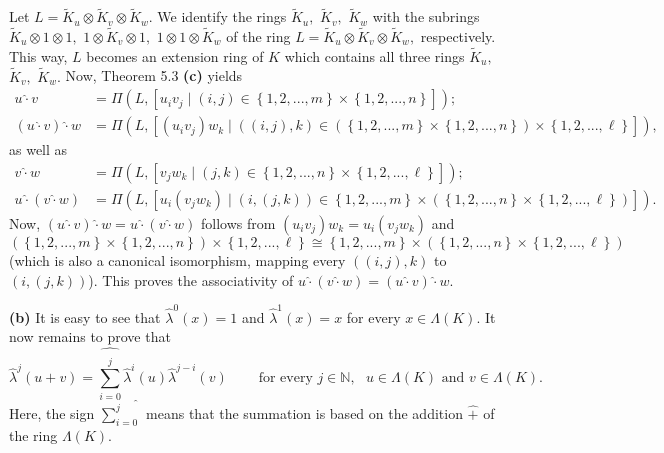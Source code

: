\documentclass[12pt,final,notitlepage,onecolumn,german]{article}%
\begin{document}
Let $L=\widetilde{K}_{u}\otimes\widetilde{K}_{v}\otimes\widetilde{K}_{w}$. We
identify the rings $\widetilde{K}_{u},$ $\widetilde{K}_{v},$ $\widetilde
{K}_{w}$ with the subrings $\widetilde{K}_{u}\otimes1\otimes1,$ $1\otimes
\widetilde{K}_{v}\otimes1,$ $1\otimes1\otimes\widetilde{K}_{w}$ of the ring
$L=\widetilde{K}_{u}\otimes\widetilde{K}_{v}\otimes\widetilde{K}_{w},$
respectively. This way, $L$ becomes an extension ring of $K$ which contains
all three rings $\widetilde{K}_{u},$ $\widetilde{K}_{v},$ $\widetilde{K}_{w}.$
Now, Theorem 5.3 \textbf{(c)} yields%
\begin{align*}
u\widehat{\cdot}v  &  =\Pi\left(  L,\left[  u_{i}v_{j}\mid\left(  i,j\right)
\in\left\{  1,2,...,m\right\}  \times\left\{  1,2,...,n\right\}  \right]
\right)  ;\\
\left(  u\widehat{\cdot}v\right)  \widehat{\cdot}w  &  =\Pi\left(  L,\left[
\left(  u_{i}v_{j}\right)  w_{k}\mid\left(  \left(  i,j\right)  ,k\right)
\in\left(  \left\{  1,2,...,m\right\}  \times\left\{  1,2,...,n\right\}
\right)  \times\left\{  1,2,...,\ell\right\}  \right]  \right)  ,
\end{align*}
as well as%
\begin{align*}
v\widehat{\cdot}w  &  =\Pi\left(  L,\left[  v_{j}w_{k}\mid\left(  j,k\right)
\in\left\{  1,2,...,n\right\}  \times\left\{  1,2,...,\ell\right\}  \right]
\right)  ;\\
u\widehat{\cdot}\left(  v\widehat{\cdot}w\right)   &  =\Pi\left(  L,\left[
u_{i}\left(  v_{j}w_{k}\right)  \mid\left(  i,\left(  j,k\right)  \right)
\in\left\{  1,2,...,m\right\}  \times\left(  \left\{  1,2,...,n\right\}
\times\left\{  1,2,...,\ell\right\}  \right)  \right]  \right)  .
\end{align*}
Now, $\left(  u\widehat{\cdot}v\right)  \widehat{\cdot}w=u\widehat{\cdot
}\left(  v\widehat{\cdot}w\right)  $ follows from $\left(  u_{i}v_{j}\right)
w_{k}=u_{i}\left(  v_{j}w_{k}\right)  $ and
\[
\left(  \left\{  1,2,...,m\right\}  \times\left\{  1,2,...,n\right\}  \right)
\times\left\{  1,2,...,\ell\right\}  \cong\left\{  1,2,...,m\right\}
\times\left(  \left\{  1,2,...,n\right\}  \times\left\{  1,2,...,\ell\right\}
\right)
\]
(which is also a canonical isomorphism, mapping every $\left(  \left(
i,j\right)  ,k\right)  $ to $\left(  i,\left(  j,k\right)  \right)  $). This
proves the associativity of $u\widehat{\cdot}\left(  v\widehat{\cdot}w\right)
=\left(  u\widehat{\cdot}v\right)  \widehat{\cdot}w$.

\textbf{(b)} It is easy to see that $\widehat{\lambda}^{0}\left(  x\right)
=1$ and $\widehat{\lambda}^{1}\left(  x\right)  =x$ for every $x\in
\Lambda\left(  K\right)  $. It now remains to prove that%
\begin{equation}
\widehat{\lambda}^{j}\left(  u+v\right)  =\widehat{\sum_{i=0}^{j}}%
\widehat{\lambda}^{i}\left(  u\right)  \widehat{\lambda}^{j-i}\left(
v\right)  \ \ \ \ \ \ \ \ \ \ \text{for every }j\in\mathbb{N},\text{ }%
u\in\Lambda\left(  K\right)  \text{ and }v\in\Lambda\left(  K\right)  .
\label{SpezLemma1}%
\end{equation}
Here, the sign $\widehat{\sum\limits_{i=0}^{j}}$ means that the summation is
based on the addition $\widehat{+}$ of the ring $\Lambda\left(  K\right)  $.
\end{document}

